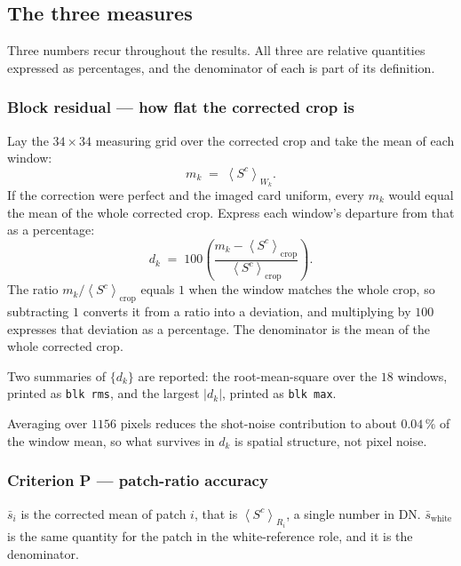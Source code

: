 \documentclass[11pt, a4paper]{article}
\newcommand{\code}[1]{\texttt{#1}}
\newcommand{\pct}{\,\%}
\newcommand{\mean}[2]{\left\langle #1 \right\rangle_{#2}}
\begin{document}
\subsection{The three measures}
\label{sec:measures}

Three numbers recur throughout the results.
All three are relative quantities expressed as percentages,
and the denominator of each is part of its definition.

\subsubsection{Block residual --- how flat the corrected crop is}
\label{sec:m-block}

Lay the $34\times34$ measuring grid over the corrected crop
and take the mean of each window:
\begin{equation}
  m_k \;=\; \mean{S^{c}}{W_k} .
\end{equation}
If the correction were perfect and the imaged card uniform,
every $m_k$ would equal the mean of the whole corrected crop.
Express each window's departure from that as a percentage:
\begin{equation}
  d_k \;=\; 100 \left( 
    \frac{m_k - \mean{S^{c}}{\mathrm{crop}}}{\mean{S^{c}}{\mathrm{crop}}}  
  \right) .
  \label{eq:block}
\end{equation}
The ratio $m_k / \mean{S^{c}}{\mathrm{crop}}$ equals $1$ when the window
matches the whole crop,
so subtracting $1$ converts it from a ratio into a deviation,
and multiplying by $100$ expresses that deviation as a percentage.
The denominator is the mean of the whole corrected crop.

Two summaries of $\{d_k\}$ are reported:
the root-mean-square over the $18$ windows,
printed as \code{blk rms},
and the largest $|d_k|$, printed as \code{blk max}.

Averaging over $1156$ pixels reduces the shot-noise contribution
to about $0.04\pct$ of the window mean,
so what survives in $d_k$ is spatial structure,
not pixel noise.

\subsubsection{Criterion P --- patch-ratio accuracy}
\label{sec:m-p}

$\bar{s}_i$ is the corrected mean of patch $i$,
that is $\mean{S^{c}}{R_i}$,
a single number in DN.
$\bar{s}_{\mathrm{white}}$ is the same quantity for the patch
in the white-reference role,
and it is the denominator.
\end{document}
